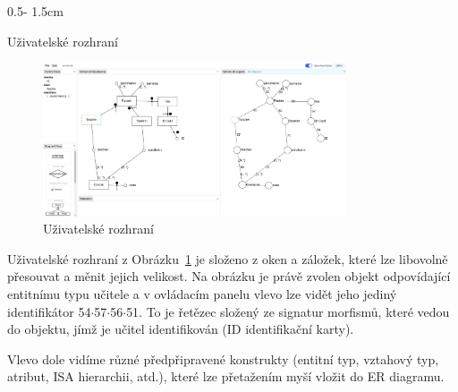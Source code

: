 \documentclass[a0paper]{uioposter}
\begin{document}
\begin{frame}
\begin{columns}[onlytextwidth]
    \begin{column}{0.5\textwidth - 1.5cm}
      \begin{block}{Uživatelské rozhraní}
        \begin{figure}
          \centering
          \includegraphics[width=0.8\textwidth]{./images/identifier-screenshot.png}
          \caption*{Uživatelské rozhraní}
          \label{fig:user-interface}
        \end{figure}

        Uživatelské rozhraní z Obrázku~\ref{fig:user-interface} je složeno z oken a záložek, které lze libovolně přesouvat a měnit jejich velikost.
        Na obrázku je právě zvolen objekt odpovídající entitnímu typu učitele a v ovládacím panelu vlevo lze vidět jeho jediný identifikátor 54$\cdot$57$\cdot$56$\cdot$51.
        To je řetězec složený ze signatur morfismů, které vedou do objektu, jímž je učitel identifikován (ID identifikační karty).

        Vlevo dole vidíme různé předpřipravené konstrukty (entitní typ, vztahový typ, atribut, ISA hierarchii, atd.), které lze přetažením myší vložit do ER diagramu.


\end{block}
\end{column}
\end{columns}
\end{frame}
\end{document}
